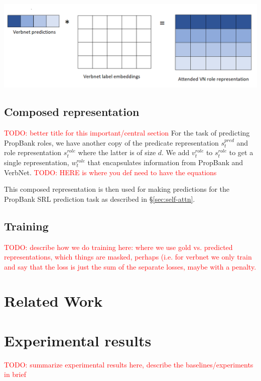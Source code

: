 \documentclass[11pt,a4paper]{article}
\newcommand{\emmatodo}[1]{\textcolor{red}{TODO: #1}}
\begin{document}
\includegraphics[scale=0.4]{model.PNG}

\subsection{Composed representation}
\emmatodo{better title for this important/central section}
For the task of predicting PropBank roles, we have another copy of the predicate representation $s_t^{pred}$ and role representation $s_t^{role}$ where the latter is of size $d$. We add $v_t^{role}$ to $s_t^{role}$ to get a single representation, $w_t^{role}$ that encapsulates information from PropBank and VerbNet. \emmatodo{HERE is where you def need to have the equations}

This composed representation is then used for making predictions for the PropBank SRL prediction task as described in \S\ref{sec:self-attn}.

\subsection{Training}
\emmatodo{describe how we do training here: where we use gold vs. predicted representations, which things are masked, perhaps (i.e. for verbnet we only train and say that the loss is just the sum of the separate losses, maybe with a penalty.}

\section{Related Work}

\section{Experimental results}

\emmatodo{summarize experimental results here, describe the baselines/experiments in brief}
\end{document}
